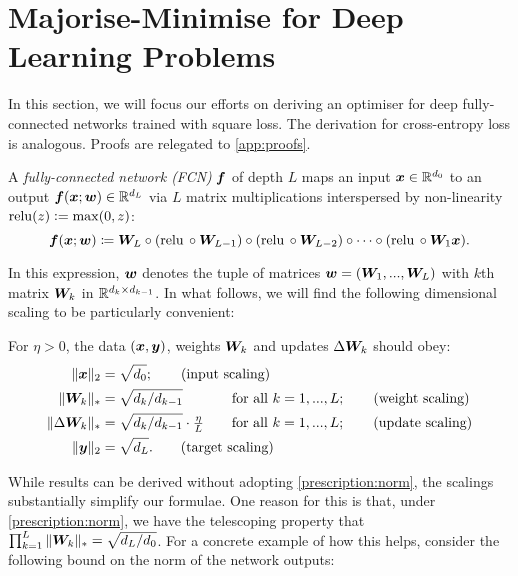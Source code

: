 \section{Majorise-Minimise for Deep Learning Problems}
\label{sec:mm-dnn}

In this section, we will focus our efforts on deriving an optimiser for deep fully-connected networks trained with square loss. The derivation for cross-entropy loss is analogous. Proofs are relegated to \cref{app:proofs}. 

\begin{definition}\label{def:dln}
A \textit{fully-connected network (FCN)} ${\bm{f}}$ of depth $L$ maps an input ${\bm{x}}\in\mathbb{R}^{d_0}$ to an output ${\bm{f}}({\bm{x}};{\bm{w}}) \in \mathbb{R}^{d_L}$ via $L$ matrix multiplications interspersed by non-linearity $\operatorname{relu}(z) \vcentcolon= \max(0,z)$:
\begin{equation*}
{\bm{f}}({\bm{x}}; {\bm{w}}) \coloneqq {\bm{W}}_L\circ(\operatorname{relu}{}\circ {\bm{W}}_{L - 1}) \circ(\operatorname{relu}{}\circ {\bm{W}}_{L - 2}) \circ \dots  \circ (\operatorname{relu}{} \circ {\bm{W}}_1 {\bm{x}}).
\end{equation*}
\end{definition}

In this expression, ${\bm{w}}$ denotes the tuple of matrices ${\bm{w}} = ({\bm{W}}_1,...,{\bm{W}}_L)$ with $k$th matrix ${\bm{W}}_k$ in $\mathbb{R}^{d_k\times d_{k-1}}$. In what follows, we will find the following dimensional scaling to be particularly convenient:
\begin{prescription}\label{prescription:norm} For $\eta>0$, the data $({\bm{x}},{\bm{y}})$, weights ${\bm{W}}_k$ and updates $\Delta{\bm{W}}_k$ should obey:
\begin{align*}
    \Vert {{\bm{x}}} \Vert_2 &= \sqrt{d_0}; \tag{input scaling} \\
    \Vert {{\bm{W}}_k} \Vert_* &= \sqrt{d_k/d_{k-1}} \hspace{1.519em}\qquad\text{for all }k=1,...,L; \tag{weight scaling} \\
    \Vert {\Delta {\bm{W}}_k} \Vert_* &= \sqrt{d_k/d_{k-1}} \cdot \tfrac{\eta}{L} \qquad\text{for all }k=1,...,L; \tag{update scaling}\\
    \Vert {{\bm{y}}} \Vert_2 &= \sqrt{d_L}. \tag{target scaling}
\end{align*}
\end{prescription}
While results can be derived without adopting \cref{prescription:norm}, the scalings substantially simplify our formulae. One reason for this is that, under \cref{prescription:norm}, we have the telescoping property that $\prod_{k=1}^L \Vert {{\bm{W}}_k} \Vert_* = \sqrt{d_L/d_0}$. For a concrete example of how this helps, consider the following bound on the norm of the network outputs:

